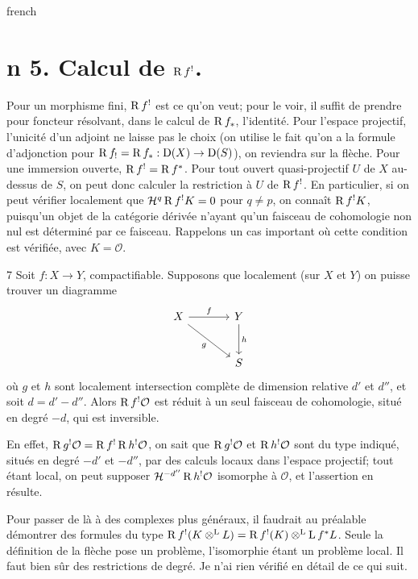\begin{hyphenrules}{french}
\section*{n\textdegree{} 5. Calcul de $\operatorname{R} f^{!}$.}\label{app:sec5}

Pour un morphisme fini, $\operatorname{R} f^{!}$ est ce qu'on veut; pour le voir, il suffit de prendre pour foncteur r\'esolvant, dans le calcul de $\operatorname{R} f_{*}$, l'identit\'e. Pour l'espace projectif, l'unicit\'e d'un adjoint ne laisse pas le choix (on utilise le fait qu'on a la formule d'adjonction pour $\operatorname{R} f_{!} = \operatorname{R} f_{*}: \operatorname{D}(X) \to \operatorname{D}(S)$), on reviendra sur la fl\`eche. Pour une immersion ouverte, $\operatorname{R} f^{!} = \operatorname{R} f^{*}$. Pour tout ouvert quasi-projectif $U$ de $X$ au-dessus de $S$, on peut donc calculer la restriction \`a $U$ de $\operatorname{R} f^{!}$. En particulier, si on peut v\'erifier localement que $\mathcal{H}^{q}\operatorname{R} f^{!}K = 0$ pour $q \neq p$, on conna\^it $\operatorname{R} f^{!}K$, puisqu'un objet de la cat\'egorie d\'eriv\'ee n'ayant qu'un faisceau de cohomologie non nul est d\'etermin\'e par ce faisceau. Rappelons un cas important o\`u cette condition est v\'erifi\'ee, avec $K = \mathcal{O}$.

\begin{samepage}
\begin{bookproposition}{7}\label{app:prop7}
Soit $f: X \to Y$, compactifiable. Supposons que localement (sur $X$ et $Y$) on puisse trouver un diagramme
\[
\begin{tikzcd}[column sep=large,row sep=large]
X \ar[r,"f"] \ar[dr,"g"'] & Y \ar[d,"h"] \\
 & S
\end{tikzcd}
\]
o\`u $g$ et $h$ sont localement intersection compl\`ete de dimension relative $d'$ et $d''$, et soit $d = d' - d''$. Alors $\operatorname{R} f^{!}\mathcal{O}$ est r\'eduit \`a un seul faisceau de cohomologie, situ\'e en degr\'e $-d$, qui est inversible.
\end{bookproposition}
\end{samepage}

En effet, $\operatorname{R} g^{!}\mathcal{O} = \operatorname{R} f^{!}\operatorname{R} h^{!}\mathcal{O}$, on sait que $\operatorname{R} g^{!}\mathcal{O}$ et $\operatorname{R} h^{!}\mathcal{O}$ sont du type indiqu\'e, situ\'es en degr\'e $-d'$ et $-d''$, par des calculs locaux dans l'espace projectif; tout \'etant local, on peut supposer $\mathcal{H}^{-d''}\operatorname{R} h^{!}\mathcal{O}$ isomorphe \`a $\mathcal{O}$, et l'assertion en r\'esulte.

Pour passer de l\`a \`a des complexes plus g\'en\'eraux, il faudrait au pr\'ealable d\'emontrer des formules du type $\operatorname{R} f^{!}(K \mathbin{\otimes^{\mathrm{L}}} L) = \operatorname{R} f^{!}(K) \mathbin{\otimes^{\mathrm{L}}} \operatorname{L} f^{*}L$. Seule la d\'efinition de la fl\`eche pose un probl\`eme, l'isomorphie \'etant un probl\`eme local. Il faut bien s\^ur des restrictions de degr\'e. Je n'ai rien v\'erifi\'e en d\'etail de ce qui suit.


\end{hyphenrules}

